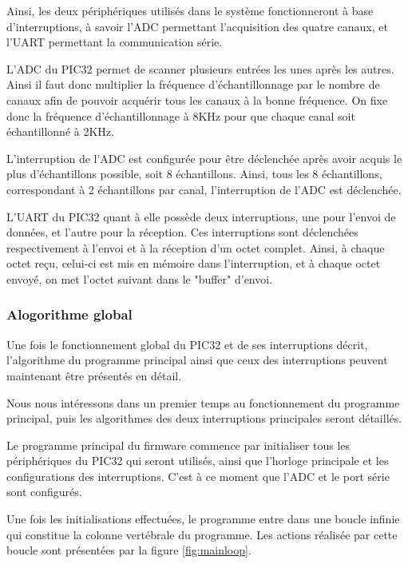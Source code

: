 \documentclass[letterpaper, twoside, 12pt, memoire, creativecommons, hyperref]{thETS}
\begin{document}
Ainsi, les deux périphériques utilisés dans le système fonctionneront à base d'interruptions, à savoir l'ADC permettant l'acquisition des quatre canaux, et l'UART permettant la communication série. 

L'ADC du PIC32 permet de scanner plusieurs entrées les unes après les autres. Ainsi il faut donc multiplier la fréquence d'échantillonnage par le nombre de canaux afin de pouvoir acquérir tous les canaux à la bonne fréquence. On fixe donc la fréquence d'échantillonnage à 8KHz pour que chaque canal soit échantillonné à 2KHz. 

L'interruption de l'ADC est configurée pour être déclenchée après avoir acquis le plus d'échantillons possible, soit 8 échantillons. Ainsi, tous les 8 échantillons, correspondant à 2 échantillons par canal, l'interruption de l'ADC est déclenchée. 

L'UART du PIC32 quant à elle possède deux interruptions, une pour l'envoi de données, et l'autre pour la réception. Ces interruptions sont déclenchées respectivement à l'envoi et à la réception d'un octet complet. Ainsi, à chaque octet reçu, celui-ci est mis en mémoire dans l'interruption, et à chaque octet envoyé, on met l'octet suivant dans le "buffer" d'envoi.

\subsubsection{Alogorithme global}

Une fois le fonctionnement global du PIC32 et de ses interruptions décrit, l'algorithme du programme principal ainsi que ceux des interruptions peuvent maintenant être présentés en détail. 

Nous nous intéressons dans un premier temps au fonctionnement du programme principal, puis les algorithmes des deux interruptions principales seront détaillés. 

Le programme principal du firmware commence par initialiser tous les périphériques du PIC32 qui seront utilisés, ainsi que l'horloge principale et les configurations des interruptions. C'est à ce moment que l'ADC et le port série sont configurés. 

Une fois les initialisations effectuées, le programme entre dans une boucle infinie qui constitue la colonne vertébrale du programme. Les actions réalisée par cette boucle sont présentées par la figure \ref{fig:mainloop}.
\end{document}

